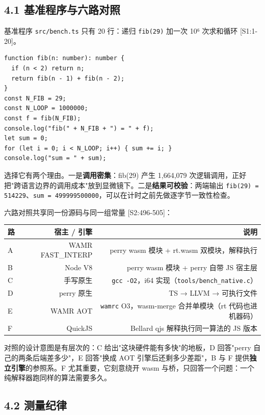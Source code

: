 \documentclass[11pt, a4paper]{article}
\begin{document}
\subsection{4.1 基准程序与六路对照}

基准程序 \texttt{src/bench.ts} 只有 20 行：递归 \texttt{fib(29)} 加一次 10⁶ 次求和循环 [S1:1-20]。


\begin{verbatim}
function fib(n: number): number {
  if (n < 2) return n;
  return fib(n - 1) + fib(n - 2);
}
const N_FIB = 29;
const N_LOOP = 1000000;
const f = fib(N_FIB);
console.log("fib(" + N_FIB + ") = " + f);
let sum = 0;
for (let i = 0; i < N_LOOP; i++) { sum += i; }
console.log("sum = " + sum);
\end{verbatim}

选择它有两个理由。一是\textbf{调用密集}：fib(29) 产生 1,664,079 次逻辑调用，正好把"跨语言边界的调用成本"放到显微镜下。二是\textbf{结果可校验}：两端输出 \texttt{fib(29) = 514229}、\texttt{sum = 499999500000}，可以在计时之前先做逐字节一致性检查。


六路对照共享同一份源码与同一组常量 [S2:496-505]：


\begin{center}\small\begin{tabular}{lrr}
\toprule
路 & 宿主 / 引擎 & 说明 \\
\midrule
A & WAMR FAST\_INTERP & perry wasm 模块 + rt.wasm 双模块，解释执行 \\
B & Node V8 & perry wasm 模块 + perry 自带 JS 宿主层 \\
C & 手写原生 & \texttt{gcc -O2}，i64 实现（\texttt{tools/bench\_native.c}） \\
D & perry 原生 & TS → LLVM → 可执行文件 \\
E & WAMR AOT & \texttt{wamrc} O3，wasm-merge 合并单模块（rt 代码也进机器码） \\
F & QuickJS & Bellard qjs 解释执行同一算法的 JS 版本 \\
\bottomrule
\end{tabular}\end{center}


对照的设计意图是有层次的：C 给出"这块硬件能有多快"的地板，D 回答"perry 自己的两条后端差多少"，E 回答"换成 AOT 引擎后还剩多少差距"，B 与 F 提供\textbf{独立引擎}的参照系。F 尤其重要，它刻意绕开 wasm 与桥，只回答一个问题：一个纯解释器跑同样的算法需要多久。


\subsection{4.2 测量纪律}
\end{document}
